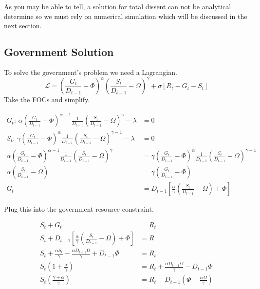 \documentclass[12pt]{article}
\begin{document}
\begin{spacing}{1.5}
As you may be able to tell, a solution for total dissent can not be analytical determine so we must rely on numerical simulation which will be discussed in the next section. 


\subsection{Government Solution}

To solve the government's problem we need a Lagrangian.
\begin{equation}
\mathcal{L} = \left(\frac{G_t}{ D_{t-1}}-\Phi\right)^\alpha \left(\frac{S_t}{ D_{t-1}}-\Omega\right)^\gamma  +\sigma[R_t-G_t-S_t] 
\end{equation}
Take the FOCs and simplify.

\begin{equation}
    \begin{aligned}
        G_t\text{: } \alpha \left(\frac{G_t}{ D_{t-1}}-\Phi\right)^{\alpha-1} \frac{1}{ D_{t-1}} \left(\frac{S_t}{D_{t-1}}-\Omega\right)^\gamma  -\lambda &=0  \\
S_t\text{: } \gamma  \left(\frac{G_t}{ D_{t-1}}-\Phi\right)^{\alpha} \frac{1}{D_{t-1}} \left(\frac{S_t}{D_{t-1}}-\Omega\right)^{\gamma -1} -\lambda &=0 \\
\alpha \left(\frac{G_t}{D_{t-1}}-\Phi\right)^{\alpha-1} \frac{1}{ D_{t-1}} \left(\frac{S_t}{D_{t-1}}-\Omega\right)^\gamma  &= \gamma  \left(\frac{G_t}{ D_{t-1}}-\Phi\right)^{\alpha} \frac{1}{ D_{t-1}} \left(\frac{S_t}{ D_{t-1}}-\Omega\right)^{\gamma -1} \\
\alpha \left(\frac{S_t}{ D_{t-1}}-\Omega \right) &= \gamma  \left( \frac{G_t}{ D_{t-1}}-\Phi \right) \\
G_t&= D_{t-1}\left[\frac{\alpha}{\gamma } \left(\frac{S_t}{ D_{t-1}} -\Omega \right)+\Phi \right]
    \end{aligned}
\end{equation}


\noindent Plug this into the government resource constraint. 


\begin{equation}
    \begin{aligned}
        S_t+G_t&=R_t \\
        S_t+  D_{t-1}\left[\frac{\alpha}{\gamma } \left(\frac{S_t}{ D_{t-1}} -\Omega \right) +\Phi \right]  &= R \\
S_t+ \frac{\alpha S_t}{\gamma } -\frac{\alpha  D_{t-1} \Omega}{\gamma } +D_{t-1}\Phi &=R_t \\
S_t\left(1+\frac{\alpha}{\gamma }\right) &= R_t+ \frac{\alpha D_{t-1} \Omega}{\gamma } - D_{t-1}\Phi \\
S_t\left(\frac{\gamma  + \alpha}{\gamma }\right) &= R_t - D_{t-1} \left(\Phi - \frac{\alpha  \Omega}{\gamma } \right) 
    \end{aligned}
\end{equation}



\end{spacing}
\end{document}
